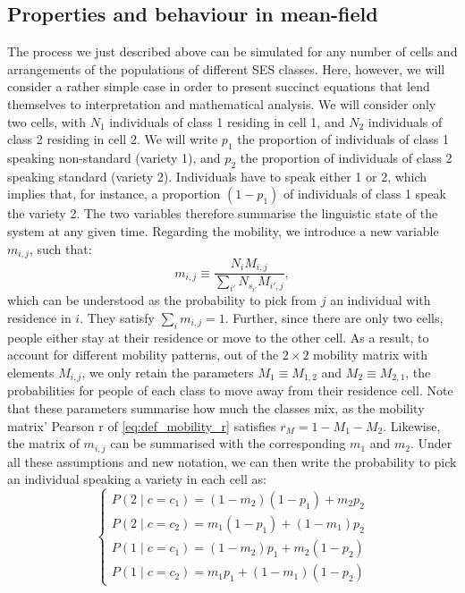 \documentclass[../thesis.tex]{subfiles}
\begin{document}
\subsection{Properties and behaviour in mean-field}
 The process we just described
above can be simulated for any number of cells and arrangements of the populations of
different \ac{SES} classes. Here, however, we will consider a rather simple case in
order to present succinct equations that lend themselves to interpretation and
mathematical analysis. We will consider only two cells, with $N_1$ individuals of class
1 residing in cell 1, and $N_2$ individuals of class 2 residing in cell 2. We will write
$p_1$ the proportion of individuals of class 1 speaking non-standard (variety 1), and
$p_2$ the proportion of individuals of class 2 speaking standard (variety 2).
Individuals have to speak either 1 or 2, which implies that, for instance, a proportion
$(1 - p_1)$ of individuals of class 1 speak the variety 2. The two variables therefore
summarise the linguistic state of the system at any given time. Regarding the mobility,
we introduce a new variable $m_{i, j}$, such that:
\begin{equation}
  m_{i, j} \equiv \frac{N_{i} M_{i, j}}{\sum_{i'} N_{s_{i'}} M_{i', j}},
\end{equation}
which can be understood as the probability to pick from $j$ an individual with residence
in $i$. They satisfy $\sum_i m_{i, j} = 1$. Further, since there are only two cells,
people either stay at their residence or move to the other cell. As a result, to account
for different mobility patterns, out of the $2 \times 2$ mobility matrix with elements
$M_{i, j}$, we only retain the parameters $M_1 \equiv M_{1, 2}$ and $M_2 \equiv M_{2,
1}$, the probabilities for people of each class to move away from their residence cell.
Note that these parameters summarise how much the classes mix, as the mobility
matrix' Pearson r of \cref{eq:def_mobility_r} satisfies $r_M = 1 - M_1 - M_2$. Likewise,
the matrix of $m_{i, j}$ can be summarised with the corresponding $m_1$ and $m_2$. Under
all these assumptions and new notation, we can then write the probability to pick an
individual speaking a variety in each cell as:
\begin{equation}
  \left\{
  \begin{aligned}
      P(2 \mid c = c_1)
          = (1 - m_2) (1 - p_1) + m_2 p_2
      \\
      P(2 \mid c = c_2)
          = m_1 (1 - p_1) + (1 - m_1) p_2
      \\
      P(1 \mid c = c_1)
          = (1 - m_2) p_1 + m_2 (1 - p_2)
      \\
      P(1 \mid c = c_2)
          = m_1 p_1 + (1 - m_1) (1 - p_2)
  \end{aligned}
  \right.
\end{equation}
\end{document}
